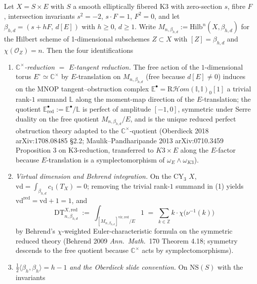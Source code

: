 \begin{proposition}[\texorpdfstring{$E$}{E}-tangent reduction as \texorpdfstring{$\mathbb C^\times$}{C-x}-quotient and the \texorpdfstring{$\tfrac12\langle\beta_h,\beta_h\rangle=h-1$}{tfrac12langlebeta-h,beta-hrangle=h-1} identification]
\label{prop:cy-c-beyond-k3e-e-tangent-reduction-c-star-quotient}
Let $X=S\times E$ with $S$ a smooth elliptically fibered K3 with
zero-section $s$, fibre $F$, intersection invariants $s^2=-2$,
$s\cdot F=1$, $F^2=0$, and let $\beta_{h,d}=(s+hF,\,d[E])$ with
$h\ge 0$, $d\ge 1$. Write
$M_{n,\beta_{h,d}}:=\mathrm{Hilb}^n(X,\beta_{h,d})$ for the Hilbert
scheme of 1-dimensional subschemes $Z\subset X$ with $[Z]=\beta_{h,d}$
and $\chi(\mathcal O_Z)=n$. Then the four identifications
\begin{enumerate}
\item \emph{$\mathbb C^\times$-reduction $=$ $E$-tangent reduction.} The
free action of the $1$-dimensional torus $E^\circ\simeq\mathbb C^\times$
by $E$-translation on $M_{n,\beta_{h,d}}$ (free because $d[E]\neq 0$)
induces on the MNOP tangent--obstruction complex
$\mathbb E^\bullet=\mathrm R\mathcal H\!om(\mathbb I,\mathbb I)_0[1]$
a trivial rank-$1$ summand $\mathbb L$ along the moment-map direction
of the $E$-translation; the quotient
$\mathbb E^\bullet_{\mathrm{red}}:=\mathbb E^\bullet/\mathbb L$ is perfect
of amplitude $[-1,0]$, symmetric under Serre duality on the free
quotient $M_{n,\beta_{h,d}}/E$, and is the unique reduced perfect
obstruction theory adapted to the $\mathbb C^\times$-quotient
(Oberdieck 2018 arXiv:1708.08485 \S 2.2; Maulik--Pandharipande 2013
arXiv:0710.3459 Proposition 3 on K3-reduction, transferred to
$K3\times E$ along the $E$-factor because $E$-translation is a
symplectomorphism of $\omega_E\wedge\omega_{K3}$).
\item \emph{Virtual dimension and Behrend integration.} On the CY$_3$
$X$, $\mathrm{vd}=\int_{\beta_{h,d}}c_1(T_X)=0$; removing the trivial
rank-$1$ summand in \textup{(1)} yields
$\mathrm{vd}^{\mathrm{red}}=\mathrm{vd}+1=1$, and
\[
 \mathrm{DT}^{X,\mathrm{red}}_{n,\beta_{h,d}}
 \;:=\; \int_{[M_{n,\beta_{h,d}}]^{\mathrm{vir,red}}/E} 1
 \;=\; \sum_{k\in\mathbb Z} k\cdot\chi\bigl(\nu^{-1}(k)\bigr)
\]
by Behrend's $\chi$-weighted Euler-characteristic formula on the
symmetric reduced theory (Behrend 2009 \emph{Ann.\ Math.}~170
Theorem 4.18; symmetry descends to the free quotient because
$\mathbb C^\times$ acts by symplectomorphisms).
\item \emph{$\tfrac12\langle\beta_h,\beta_h\rangle=h-1$ and the
Oberdieck slide convention.} On $\mathrm{NS}(S)$ with the invariants

\end{enumerate}
\end{proposition}
